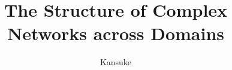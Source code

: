 \documentclass[defaultstyle,11pt]{thesis}
\title{The Structure of Complex Networks across Domains}
\author{Kansuke}{Ikehara}
\begin{document}









\nocite{*}		%

%
%
\end{document}
